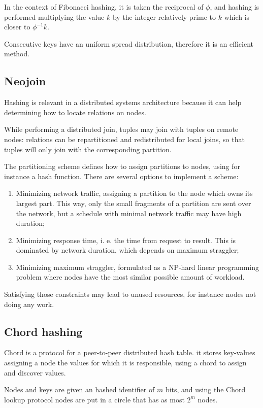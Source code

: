 In the context of Fibonacci hashing, it is taken the reciprocal of $\phi$, and hashing is performed multiplying the value $k$ by the integer relatively prime to $k$ which is closer to $\phi^{-1}k$. 

Consecutive keys have an uniform spread distribution, therefore it is an efficient method.

\subsection{Neojoin}
Hashing is relevant in a distributed systems architecture because it can help determining how to locate relations on nodes.

While performing a distributed join, tuples may join with tuples on remote nodes: relations can be repartitioned and redistributed for local joins, so that tuples will only join with the corresponding partition.

The partitioning scheme defines how to assign partitions to nodes, using for instance a hash function. There are several options to implement a scheme:
\begin{enumerate}
	\item Minimizing network traffic, assigning a partition to the node which owns its largest part. This way, only the small fragments of a partition are sent over the network, but a schedule with minimal network traffic may have high duration;
	\item Minimizing response time, i. e. the time from request to result. This is dominated by network duration, which depends on maximum straggler;
	\item Minimizing maximum straggler, formulated as a NP-hard linear programming problem where nodes have the most similar possible amount of workload.
\end{enumerate}

Satisfying those constraints may lead to unused resources, for instance nodes not doing any work.

\subsection{Chord hashing}
Chord is a protocol for a peer-to-peer distributed hash table. it stores key-values assigning a node the values for which it is responsible, using a chord to assign and discover values.

Nodes and keys are given an hashed identifier of $m$ bits, and using the Chord lookup protocol nodes are put in a circle that has as most $2^m$ nodes. 

